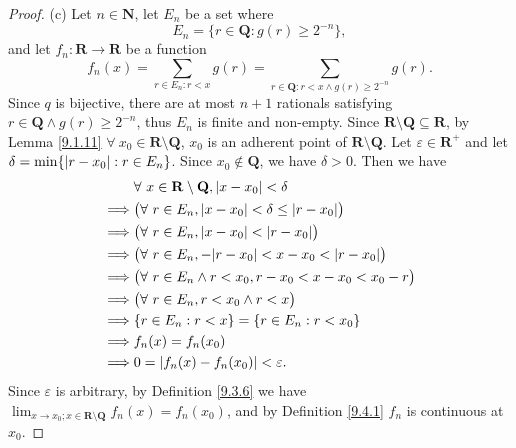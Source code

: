 \begin{proof}{(c)}
    Let \(n \in \mathbf{N}\), let \(E_n\) be a set where
    \[
        E_n = \{r \in \mathbf{Q} : g(r) \geq 2^{-n}\},
    \]
    and let \(f_n : \mathbf{R} \to \mathbf{R}\) be a function
    \[
        f_n(x) = \sum_{r \in E_n : r < x} g(r) = \sum_{r \in \mathbf{Q} : r < x \land g(r) \geq 2^{-n}} g(r).
    \]
    Since \(q\) is bijective, there are at most \(n + 1\) rationals satisfying \(r \in \mathbf{Q} \land g(r) \geq 2^{-n}\), thus \(E_n\) is finite and non-empty.
    Since \(\mathbf{R} \setminus \mathbf{Q} \subseteq \mathbf{R}\), by Lemma \ref{9.1.11} \(\forall\ x_0 \in \mathbf{R} \setminus \mathbf{Q}\), \(x_0\) is an adherent point of \(\mathbf{R} \setminus \mathbf{Q}\).
    Let \(\varepsilon \in \mathbf{R}^+\) and let \(\delta = \min\{\abs*{r - x_0} : r \in E_n\}\).
    Since \(x_0 \notin \mathbf{Q}\), we have \(\delta > 0\).
    Then we have
    \begin{align*}
        & \forall\ x \in \mathbf{R} \setminus \mathbf{Q}, \abs*{x - x_0} < \delta \\
        \implies & \big(\forall\ r \in E_n, \abs*{x - x_0} < \delta \leq \abs*{r - x_0}\big) \\
        \implies & \big(\forall\ r \in E_n, \abs*{x - x_0} < \abs*{r - x_0}\big) \\
        \implies & \big(\forall\ r \in E_n, -\abs*{r - x_0} < x - x_0 < \abs*{r - x_0}\big) \\
        \implies & \big(\forall\ r \in E_n \land r < x_0, r - x_0 < x - x_0 < x_0 - r\big) \\
        \implies & \big(\forall\ r \in E_n, r < x_0 \land r < x\big) \\
        \implies & \{r \in E_n : r < x\} = \{r \in E_n : r < x_0\} \\
        \implies & f_n(x) = f_n(x_0) \\
        \implies & 0 = \abs*{f_n(x) - f_n(x_0)} < \varepsilon.
    \end{align*}
    Since \(\varepsilon\) is arbitrary, by Definition \ref{9.3.6} we have \(\lim_{x \to x_0 ; x \in \mathbf{R} \setminus \mathbf{Q}} f_n(x) = f_n(x_0)\), and by Definition \ref{9.4.1} \(f_n\) is continuous at \(x_0\).


\end{proof}
